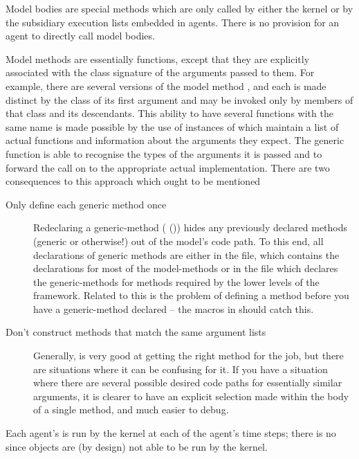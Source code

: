 Model bodies are special methods which are only called by either the kernel
or by the subsidiary execution lists embedded in agents. There is no
provision for an agent to directly call model bodies.

Model methods are essentially functions, except that they are
explicitly associated with the class signature of the arguments passed
to them. For example, there are several versions of the model method
, and each is made distinct by the class of its first
argument and may be invoked only by members of that class and its
descendants.  This ability to have several functions with the same
name is made possible by the use of instances of
 which maintain a list of actual functions and
information about the arguments they expect.  The generic function is
able to recognise the types of the arguments it is passed and to
forward the call on to the appropriate actual implementation.  There
are two consequences to this approach which ought to be mentioned
\begin{description}
  \item[Only define each generic method once] Redeclaring a generic-method
    (  ()) hides any previously
      declared  methods (generic or otherwise!) out of
      the model's code path. To this end, all declarations of generic
      methods are either in the  file, which
      contains the declarations for most of the model-methods or in
      the  file which declares the
      generic-methods for methods required by the lower levels of the
      framework.  Related to this is the problem of defining a method
      before you have a generic-method declared --  the macros in
       should catch this.
  \item[Don't construct methods that match the same argument
    lists] Generally, \SCLOS is very good at getting the right
    method for the job, but there are situations where it can be
    confusing for it.  If you have a situation where there are several
    possible desired code paths for essentially similar arguments, it
    is clearer to have an explicit selection made within the body of a
    single method, and much easier to debug.
\end{description}
 
Each agent's  is run by the kernel at each of the
agent's time steps; there is no  since objects are
(by design) not able to be run by the kernel.


